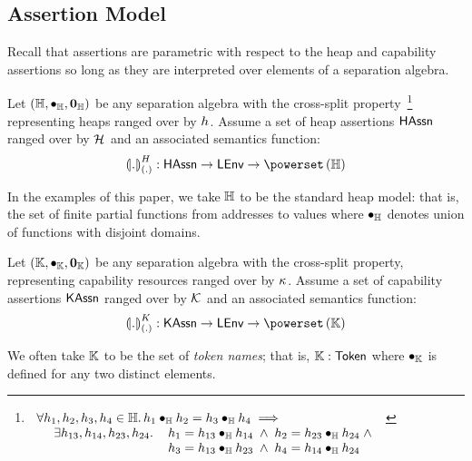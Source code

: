 \subsection{Assertion Model}
Recall that \colosl assertions are parametric with respect to the heap and capability assertions so long as they are interpreted over elements of a separation algebra. 
%
\begin{parameter}\label{par:heapSA}
Let $(\mathbb{H}, \bullet_{\mathbb{H}}, \mathbf{0}_{\mathbb{H}})$ be any separation algebra with the cross-split property~\cite{dockins2009fresh}\footnote{%
$	
\begin{array}[t]{l}
	\forall h_1, h_2, h_3, h_4 \in \mathbb{H}.\,
	h_1 \bullet_{\mathbb{H}} h_2 = h_3 \bullet_{\mathbb{H}} h_4 \implies \\
	\hspace*{0.3cm}	
	\begin{array}{l l}
		\exists h_{13}, h_{14}, h_{23}, h_{24}.\, &
		h_1 = h_{13} \bullet_{\mathbb{H}} h_{14} \;\land\; h_2 = h_{23} \bullet_{\mathbb{H}} h_{24} \;\land\\
		& h_3 = h_{13} \bullet_{\mathbb{H}} h_{23} \;\land\; h_4 = h_{14} \bullet_{\mathbb{H}} h_{24}
	\end{array}
\end{array}
$%
} representing heaps ranged over by $h_{}$. Assume a set of heap assertions $\textsf{HAssn}$ ranged over by $\mathcal{H}_{}$ and an associated semantics function:
%
\[
	\semH[\blankArg]{.} : \HAssertions \rightarrow \LEnv \rightarrow \pset{\Heaps}
\]
%
\end{parameter}
%
In the examples of this paper, we take $\mathbb{H}$ to be the standard heap model: that is, the set of finite partial functions from addresses to values where $\bullet_{\mathbb{H}}$ denotes union of functions with disjoint domains.
%
%
\begin{parameter}\label{par:capSA}
Let $\left(\mathbb{K}, \bullet_{\mathbb{K}}, \mathbf{0}_{\mathbb{K}}\right)$ be any separation algebra with the cross-split property, representing capability resources ranged over by $\kappa_{}$. Assume a set of capability assertions $\textsf{KAssn}$ ranged over by $\mathcal{K}_{}$ and an associated semantics function:
%
\[
	\semK[\blankArg]{.} : \KAssertions \rightarrow \LEnv \rightarrow \pset{\Caps}
\]
%
\end{parameter}
%
%
We often take $\mathbb{K}$ to be the set of \emph{token names}; that is, $\mathbb{K}: \textsf{Token}$ where $\bullet_{\mathbb{K}}$ is defined for any two distinct elements. 

